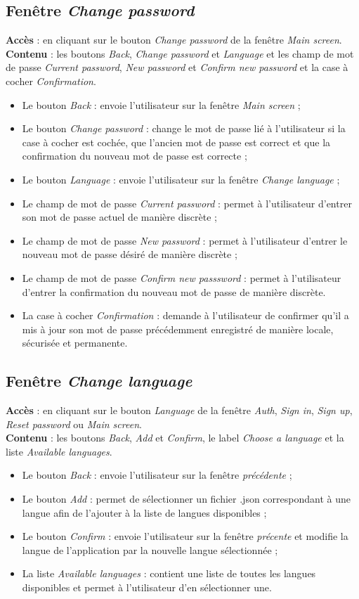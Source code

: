 \documentclass{article}
\newcommand{\navbutton}[2]{Le bouton \emph{#1} : envoie l'utilisateur sur la fenêtre \emph{#2}}
\newcommand{\passwordfield}[2]{Le champ de mot de passe \emph{#1} : permet à l'utilisateur d'entrer #2 de manière discrète}
\newcommand{\access}[1]{ \noindent\textbf{Accès} : #1 \\}
\newcommand{\content}[1]{\textbf{Contenu} : #1}
\begin{document}
\subsection{Fenêtre \emph{Change password}}
\access{en cliquant sur le bouton \emph{Change password} de la fenêtre \emph{Main screen}.}
\content{les boutons \emph{Back}, \emph{Change password} et \emph{Language} et les champ de mot de passe \emph{Current password}, \emph{New password} et \emph{Confirm new password} et la case à cocher \emph{Confirmation}.}
\begin{itemize}
\item \navbutton{Back}{Main screen} ;
\item Le bouton \emph{Change password} : change le mot de passe lié à l'utilisateur si la case à cocher est cochée, que l'ancien mot de passe est correct et que la confirmation du nouveau mot de passe est correcte ;
\item \navbutton{Language}{Change language} ;
\item \passwordfield{Current password}{son mot de passe actuel} ;
\item \passwordfield{New password}{le nouveau mot de passe désiré} ;
\item \passwordfield{Confirm new passsword}{la confirmation du nouveau mot de passe}.
\item La case à cocher \emph{Confirmation} : demande à l'utilisateur de confirmer qu'il a mis à jour son mot de passe précédemment enregistré de manière locale, sécurisée et permanente.
\end{itemize}


\subsection{Fenêtre \emph{Change language}}
\access{en cliquant sur le bouton \emph{Language} de la fenêtre \emph{Auth}, \emph{Sign in}, \emph{Sign up}, \emph{Reset password} ou \emph{Main screen}.}
\content{les boutons \emph{Back}, \emph{Add} et \emph{Confirm}, le label \emph{Choose a language} et la liste \emph{Available languages}.}
\begin{itemize}
\item \navbutton{Back}{précédente} ;
\item Le bouton \emph{Add} : permet de sélectionner un fichier .json correspondant à une langue afin de l'ajouter à la liste de langues disponibles ;
\item \navbutton{Confirm}{précente} et modifie la langue de l'application par la nouvelle langue sélectionnée ;
\item La liste \emph{Available languages} : contient une liste de toutes les langues disponibles et permet à l'utilisateur d'en sélectionner une.
\end{itemize}
\end{document}
